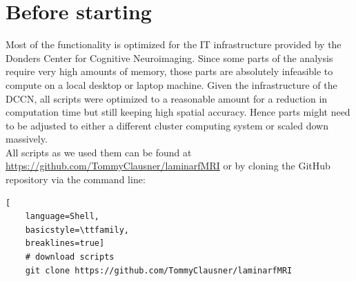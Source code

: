 \documentclass[12pt,a4paper]{scrartcl}
\begin{document}
\section{Before starting}
Most of the functionality is optimized for the IT infrastructure provided by the Donders Center for Cognitive Neuroimaging. Since some parts of the analysis require very high amounts of memory, those parts are absolutely infeasible to compute on a local desktop or laptop machine. Given the infrastructure of the DCCN, all scripts were optimized to a reasonable amount for a reduction in computation time but still keeping high spatial accuracy. Hence parts might need to be adjusted to either a different cluster computing system or scaled down massively.\\
All scripts as we used them can be found at \href{https://github.com/TommyClausner/laminarfMRI}{https://github.com/TommyClausner/laminarfMRI}
or by cloning the GitHub repository via the command line:
\begin{lstlisting}[
    language=Shell,
    basicstyle=\ttfamily,
    breaklines=true]
    # download scripts
    git clone https://github.com/TommyClausner/laminarfMRI
\end{lstlisting}
\end{document}
